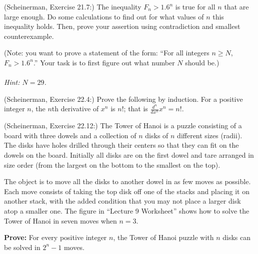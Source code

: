 \documentclass{article}
\theoremstyle{definition}
\begin{document}
\begin{question}
    (Scheinerman, Exercise 21.7:) 
    The inequality $F_n > 1.6^n$ is true for all $n$ that are large enough.  Do some calculations to find out for what values of $n$ this inequality holds.  Then, prove your assertion using contradiction and smallest counterexample.

    (Note: you want to prove a statement of the form: ``For all integers $n \geq N$, $F_n > 1.6^n$.''  Your task is to first figure out what number $N$ should be.)\\~\\
    \textit{Hint: $N=29$.}
\end{question}
\begin{solution}
\end{solution}


\begin{question}
    (Scheinerman, Exercise 22.4:) 
    Prove the following by induction.  For a positive integer $n$, the $n$th derivative of $x^n$ is $n!$; that is $ \displaystyle \frac{d^n}{dx^n} x^n = n!$.
\end{question}
\begin{solution}
\end{solution}


\begin{question}
    (Scheinerman, Exercise 22.12:) 
    The Tower of Hanoi is a puzzle consisting of a board with three dowels and a collection of $n$ disks of $n$ different sizes (radii).  The disks have holes drilled through their centers so that they can fit on the dowels on the board.  Initially all disks are on the first dowel and tare arranged in size order (from the largest on the bottom to the smallest on the top).

    The object is to move all the disks to another dowel in as few moves as possible.  Each move consists of taking the top disk off one of the stacks and placing it on another stack, with the added condition that you may not place a larger disk atop a smaller one.  The figure in ``Lecture 9 Worksheet'' shows how to solve the Tower of Hanoi in seven moves when $n = 3$.
    
    \textbf{Prove:}  For every positive integer $n$, the Tower of Hanoi puzzle with $n$ disks can be solved in $2^n-1$ moves.
\end{question}
\begin{solution}
\end{solution}
\end{document}
